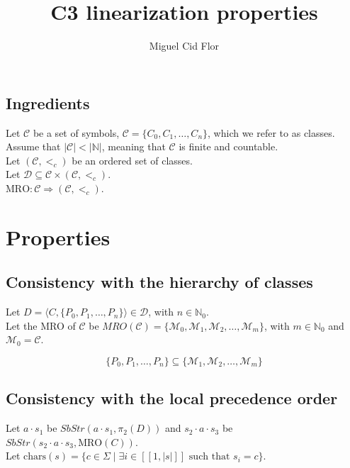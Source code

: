 \documentclass{article}
\author{Miguel Cid Flor}
\title{C3 linearization properties}
\begin{document}
\maketitle

\subsection*{Ingredients}

Let \( \mathcal{C} \) be a set of symbols, \( \mathcal{C} = \{ C_0, C_1, \ldots, C_n \} \), which we refer to as classes.\\
Assume that \( |\mathcal{C}| < |\mathbb{N}| \), meaning that \( \mathcal{C} \) is finite and countable.
\\
Let $(\mathcal{C}, <_c)$ be an ordered set of classes.\\
Let $\mathcal{D} \subseteq \mathcal{C} \times (\mathcal{C},<_c)$.\\
$\text{MRO} : \mathcal{C} \Rightarrow (\mathcal{C},<_c)$.

\vspace{2cm}

\section*{Properties}

\vspace{1cm}
\subsection*{Consistency with the hierarchy of classes} 

Let $D = \langle C, \{P_0, P_1, \dots, P_n\} \rangle \in \mathcal{D}$, with $n\in\mathbb{N}_0$.\\
Let the MRO of $\mathcal{C}$ be $MRO(\mathcal{C}) = \{\mathcal{M}_0, \mathcal{M}_1, \mathcal{M}_2, \dots, \mathcal{M}_m\}$, with $m \in \mathbb{N}_0$ and $\mathcal{M}_0 = \mathcal{C}$.

\[
\{P_0, P_1, \dots, P_n\} \subseteq \{\mathcal{M}_1, \mathcal{M}_2, \dots, \mathcal{M}_m\}
\]

\vspace{3cm}
\subsection*{Consistency with the local precedence order}
Let $a \cdot s_1$ be $SbStr(a \cdot s_1, \pi_2(D))$ and $s_2 \cdot a \cdot s_3$ be $SbStr(s_2 \cdot a \cdot s_3, \text{MRO}(C))$.\\
Let $\text{chars}(s) = \{ c \in \Sigma \mid \exists i \in [\![ 1, |s| ]\!] \text{ such that } s_i = c \}$.\\
\end{document}

